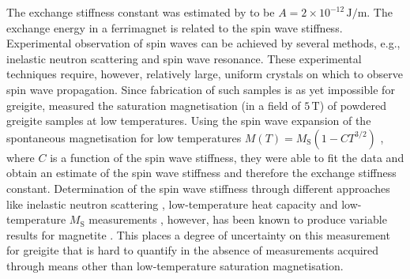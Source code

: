 The exchange stiffness constant was estimated by \citet{Chang2008} to be $A=2\times10^{-12}\,\text{J}/\text{m}$. The exchange energy in a ferrimagnet is related to the spin wave stiffness. Experimental observation of spin waves can be achieved by several methods, e.g., inelastic neutron scattering and spin wave resonance. These experimental techniques require, however, relatively large, uniform crystals on which to observe spin wave propagation. Since fabrication of such samples is as yet impossible for greigite, \citet{Chang2008} measured the saturation magnetisation (in a field of $5\,\text{T}$) of powdered greigite samples at low temperatures. Using the spin wave expansion of the spontaneous magnetisation for low temperatures $M(T)=M_{\text{S}}(1-CT^{3/2})$ \citep{Bloch1932}, where $C$ is a function of the spin wave stiffness, they were able to fit the data and obtain an estimate of the spin wave stiffness and therefore the exchange stiffness constant. Determination of the spin wave stiffness through different approaches like inelastic neutron scattering \citep{Torrie1967}, low-temperature heat capacity \citep{Kenan1963} and low-temperature $M_{\text{S}}$ measurements \citep{Aragon1992}, however, has been known to produce variable results for magnetite \citep{Chang2008}. This places a degree of uncertainty on this measurement for greigite that is hard to quantify in the absence of measurements acquired through means other than low-temperature saturation magnetisation.\par

